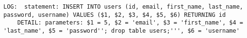 \begin{lstlisting}[caption={Log of ASP.NET injection request},breaklines=true,label={lst:aspnetInjectionLog}]
    LOG:  statement: INSERT INTO users (id, email, first_name, last_name, password, username) VALUES ($1, $2, $3, $4, $5, $6) RETURNING id
    DETAIL: parameters: $1 = 5, $2 = 'email', $3 = 'first_name', $4 = 'last_name', $5 = 'password''; drop table users;''', $6 = 'username'
\end{lstlisting}
